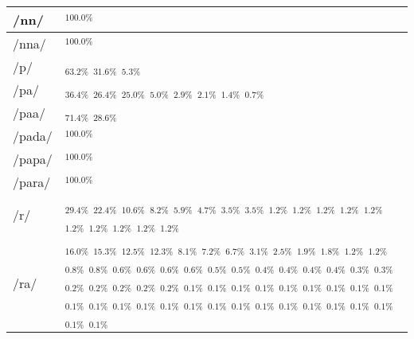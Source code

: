 \documentclass{article}
\begin{document}
\begin{longtable}{|l|p{}|}
/nn/ & \textIndus{}$_{100.0\%}$ \\ \hline
/nna/ & \textIndus{}$_{100.0\%}$ \\ \hline
/p/ & \textIndus{}$_{63.2\%}$ \quad \textIndus{}$_{31.6\%}$ \quad \textIndus{}$_{5.3\%}$ \\ \hline
/pa/ & \textIndus{}$_{36.4\%}$ \quad \textIndus{}$_{26.4\%}$ \quad \textIndus{}$_{25.0\%}$ \quad \textIndus{}$_{5.0\%}$ \quad \textIndus{}$_{2.9\%}$ \quad \textIndus{}$_{2.1\%}$ \quad \textIndus{}$_{1.4\%}$ \quad \textIndus{}$_{0.7\%}$ \\ \hline
/paa/ & \textIndus{}$_{71.4\%}$ \quad \textIndus{}$_{28.6\%}$ \\ \hline
/pada/ & \textIndus{}$_{100.0\%}$ \\ \hline
/papa/ & \textIndus{}$_{100.0\%}$ \\ \hline
/para/ & \textIndus{}$_{100.0\%}$ \\ \hline
/r/ & \textIndus{}$_{29.4\%}$ \quad \textIndus{}$_{22.4\%}$ \quad \textIndus{}$_{10.6\%}$ \quad \textIndus{}$_{8.2\%}$ \quad \textIndus{}$_{5.9\%}$ \quad \textIndus{}$_{4.7\%}$ \quad \textIndus{}$_{3.5\%}$ \quad \textIndus{}$_{3.5\%}$ \quad \textIndus{}$_{1.2\%}$ \quad \textIndus{}$_{1.2\%}$ \quad \textIndus{}$_{1.2\%}$ \quad \textIndus{}$_{1.2\%}$ \quad \textIndus{}$_{1.2\%}$ \quad \textIndus{}$_{1.2\%}$ \quad \textIndus{}$_{1.2\%}$ \quad \textIndus{}$_{1.2\%}$ \quad \textIndus{}$_{1.2\%}$ \quad \textIndus{}$_{1.2\%}$ \\ \hline
/ra/ & \textIndus{}$_{16.0\%}$ \quad \textIndus{}$_{15.3\%}$ \quad \textIndus{}$_{12.5\%}$ \quad \textIndus{}$_{12.3\%}$ \quad \textIndus{}$_{8.1\%}$ \quad \textIndus{}$_{7.2\%}$ \quad \textIndus{}$_{6.7\%}$ \quad \textIndus{}$_{3.1\%}$ \quad \textIndus{}$_{2.5\%}$ \quad \textIndus{}$_{1.9\%}$ \quad \textIndus{}$_{1.8\%}$ \quad \textIndus{}$_{1.2\%}$ \quad \textIndus{}$_{1.2\%}$ \quad \textIndus{}$_{0.8\%}$ \quad \textIndus{}$_{0.8\%}$ \quad \textIndus{}$_{0.6\%}$ \quad \textIndus{}$_{0.6\%}$ \quad \textIndus{}$_{0.6\%}$ \quad \textIndus{}$_{0.6\%}$ \quad \textIndus{}$_{0.5\%}$ \quad \textIndus{}$_{0.5\%}$ \quad \textIndus{}$_{0.4\%}$ \quad \textIndus{}$_{0.4\%}$ \quad \textIndus{}$_{0.4\%}$ \quad \textIndus{}$_{0.4\%}$ \quad \textIndus{}$_{0.3\%}$ \quad \textIndus{}$_{0.3\%}$ \quad \textIndus{}$_{0.2\%}$ \quad \textIndus{}$_{0.2\%}$ \quad \textIndus{}$_{0.2\%}$ \quad \textIndus{}$_{0.2\%}$ \quad \textIndus{}$_{0.2\%}$ \quad \textIndus{}$_{0.1\%}$ \quad \textIndus{}$_{0.1\%}$ \quad \textIndus{}$_{0.1\%}$ \quad \textIndus{}$_{0.1\%}$ \quad \textIndus{}$_{0.1\%}$ \quad \textIndus{}$_{0.1\%}$ \quad \textIndus{}$_{0.1\%}$ \quad \textIndus{}$_{0.1\%}$ \quad \textIndus{}$_{0.1\%}$ \quad \textIndus{}$_{0.1\%}$ \quad \textIndus{}$_{0.1\%}$ \quad \textIndus{}$_{0.1\%}$ \quad \textIndus{}$_{0.1\%}$ \quad \textIndus{}$_{0.1\%}$ \quad \textIndus{}$_{0.1\%}$ \quad \textIndus{}$_{0.1\%}$ \quad \textIndus{}$_{0.1\%}$ \quad \textIndus{}$_{0.1\%}$ \quad \textIndus{}$_{0.1\%}$ \quad \textIndus{}$_{0.1\%}$ \quad \textIndus{}$_{0.1\%}$ \quad \textIndus{}$_{0.1\%}$ \quad \textIndus{}$_{0.1\%}$ \quad \textIndus{}$_{0.1\%}$ \quad \textIndus{}$_{0.1\%}$ \\ \hline

\end{longtable}
\end{document}

